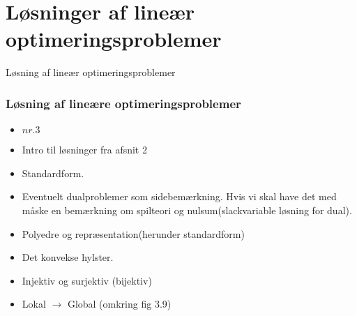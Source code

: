 \section{Løsninger af lineær optimeringsproblemer}
%
\begin{frame}
\centering
\Huge
Løsning af lineær optimeringsproblemer 
\end{frame}
%
\begin{frame}
\frametitle{Løsning af lineære optimeringsproblemer}
\begin{itemize}
\item \textbf{$nr. 3$}
\item Intro til løsninger fra afsnit 2
\item Standardform.
\item Eventuelt dualproblemer som sidebemærkning. Hvis vi skal have det med måske en bemærkning om spilteori og nulsum(slackvariable løsning for dual).
\item Polyedre og repræsentation(herunder standardform)
\item Det konvekse hylster.
\item Injektiv og surjektiv (bijektiv)
\item Lokal $\rightarrow$ Global (omkring fig 3.9)
\end{itemize}
\end{frame}